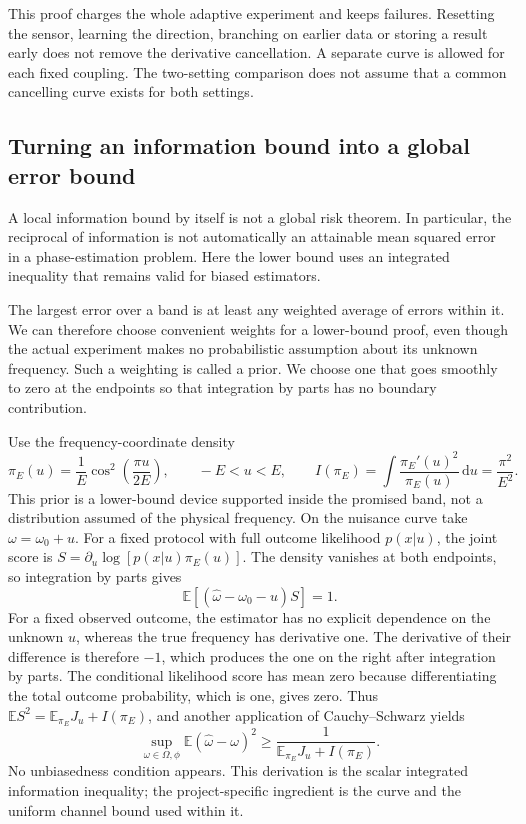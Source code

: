 \documentclass[11pt,a4paper]{article}
\numberwithin{equation}{section}
\theoremstyle{remark}
\newcommand{\dd}{\mathrm d}
\begin{document}
This proof charges the whole adaptive experiment and keeps failures.
Resetting the sensor, learning the direction, branching on earlier data
or storing a result early does not remove the derivative cancellation.
A separate curve is allowed for each fixed coupling. The two-setting
comparison does not assume that a common cancelling curve exists for
both settings.

\subsection{Turning an information bound into a global error bound}
\label{micro:bayes}

A local information bound by itself is not a global risk theorem.
In particular, the reciprocal of information is not automatically an
attainable mean squared error in a phase-estimation problem. Here the
lower bound uses an integrated inequality that remains valid for biased
estimators.

The largest error over a band is at least any weighted average of errors
within it. We can therefore choose convenient weights for a lower-bound
proof, even though the actual experiment makes no probabilistic assumption
about its unknown frequency. Such a weighting is called a prior. We choose
one that goes smoothly to zero at the endpoints so that integration by
parts has no boundary contribution.

Use the frequency-coordinate density
\begin{equation}
 \pi_E(u)=\frac1E\cos^2\!\left(\frac{\pi u}{2E}\right),
 \qquad -E<u<E,
 \qquad
 I(\pi_E)=\int\frac{\pi_E'(u)^2}{\pi_E(u)}\,\dd u
                         =\frac{\pi^2}{E^2}.
 \label{micro:prior}
\end{equation}
This prior is a lower-bound device supported inside the promised band,
not a distribution assumed of the physical frequency. On the nuisance
curve take $\omega=\omega_0+u$. For a fixed protocol with full outcome
likelihood $p(x|u)$, the joint score is
$S=\partial_u\log[p(x|u)\pi_E(u)]$. The density vanishes at both
endpoints, so integration by parts gives
\begin{equation}
 \mathbb E[(\widehat\omega-\omega_0-u)S]=1.
\end{equation}
For a fixed observed outcome, the estimator has no explicit dependence on
the unknown $u$, whereas the true frequency has derivative one. The
derivative of their difference is therefore $-1$, which produces the one
on the right after integration by parts. The conditional likelihood score
has mean zero because differentiating the total outcome probability,
which is one, gives zero. Thus
$\mathbb ES^2=\mathbb E_{\pi_E}J_u+I(\pi_E)$, and another application of
Cauchy--Schwarz yields
\begin{equation}
 \sup_{\omega\in\Omega,\phi}
       \mathbb E(\widehat\omega-\omega)^2
 \ge \frac1{\mathbb E_{\pi_E}J_u+I(\pi_E)}.
 \label{micro:bayesbound}
\end{equation}
No unbiasedness condition appears. This derivation is the scalar
integrated information inequality; the project-specific ingredient is
the curve and the uniform channel bound used within it.
\end{document}
